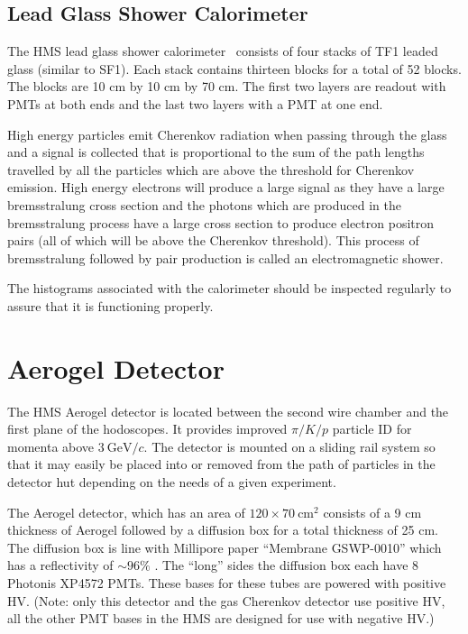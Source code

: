 {\subsection{Lead Glass Shower Calorimeter}

The HMS lead glass shower
calorimeter~\cite{Mkrtchyan201385}
consists of four stacks of
TF1 leaded glass (similar to SF1). Each stack contains thirteen
blocks for a total of 52 blocks. The blocks are 10 cm by 10 cm by 70
cm.  The first two layers are readout with PMTs at both ends and the
last two layers with a PMT at one end.

High energy particles
emit Cherenkov radiation when passing through the glass and a signal
is collected that is proportional to the sum of the path lengths
travelled by all the
particles which are above the threshold for Cherenkov emission. High energy
electrons will produce a large signal as they have a large bremsstralung
cross section and the photons which are produced in the bremsstralung
process have a large cross section to produce electron positron pairs
(all of which will be above the Cherenkov threshold). This process
of bremsstralung followed by pair production is called an electromagnetic
shower.

The histograms associated with the calorimeter should be inspected
regularly to assure that it is functioning properly.

\section{Aerogel Detector}
The HMS Aerogel detector\cite{Asaturyan2005364} is located between the
second wire chamber and the first plane of the hodoscopes.  It
provides improved $\pi/K/p$ particle ID for momenta above
$3~\textrm{GeV}/c$.  The detector is mounted on a sliding rail system
so that it may easily be placed into or removed from the path of
particles in the detector hut depending on the needs of a given
experiment.

The Aerogel detector, which has an area of $120\times
70~\textrm{cm}^2$ consists of a 9 cm thickness of Aerogel followed by a
diffusion box for a total thickness of 25 cm. The diffusion box is
line with Millipore paper ``Membrane GSWP-0010'' which has a
reflectivity of $\sim 96\%$ \cite{millipore}.   The ``long'' sides the diffusion
box each have 8 Photonis XP4572 PMTs.  These bases for these tubes are
powered with positive HV.
(Note: only this detector and the gas Cherenkov detector
use positive HV, all the other PMT bases in the HMS are designed for
use with negative HV.)

}
